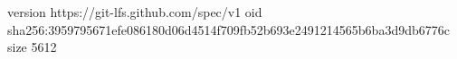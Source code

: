 version https://git-lfs.github.com/spec/v1
oid sha256:3959795671efe086180d06d4514f709fb52b693e2491214565b6ba3d9db6776c
size 5612
